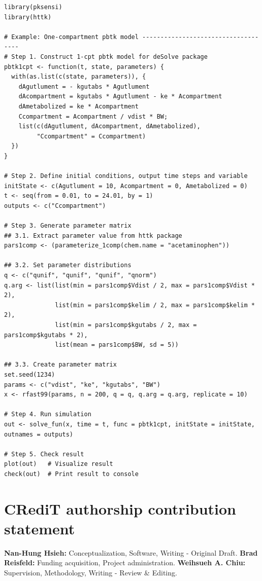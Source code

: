 \documentclass[preprint,12pt, a4paper]{elsarticle}
\begin{document}
\begin{lstlisting}
library(pksensi)
library(httk)

# Example: One-compartment pbtk model ------------------------------------
# Step 1. Construct 1-cpt pbtk model for deSolve package
pbtk1cpt <- function(t, state, parameters) {
  with(as.list(c(state, parameters)), {
    dAgutlument = - kgutabs * Agutlument
    dAcompartment = kgutabs * Agutlument - ke * Acompartment
    dAmetabolized = ke * Acompartment
    Ccompartment = Acompartment / vdist * BW;
    list(c(dAgutlument, dAcompartment, dAmetabolized), 
         "Ccompartment" = Ccompartment) 
  })
}

# Step 2. Define initial conditions, output time steps and variable
initState <- c(Agutlument = 10, Acompartment = 0, Ametabolized = 0)
t <- seq(from = 0.01, to = 24.01, by = 1)
outputs <- c("Ccompartment")

# Step 3. Generate parameter matrix 
## 3.1. Extract parameter value from httk package
pars1comp <- (parameterize_1comp(chem.name = "acetaminophen"))

## 3.2. Set parameter distributions
q <- c("qunif", "qunif", "qunif", "qnorm")
q.arg <- list(list(min = pars1comp$Vdist / 2, max = pars1comp$Vdist * 2),
              list(min = pars1comp$kelim / 2, max = pars1comp$kelim * 2),
              list(min = pars1comp$kgutabs / 2, max = pars1comp$kgutabs * 2),
              list(mean = pars1comp$BW, sd = 5))

## 3.3. Create parameter matrix
set.seed(1234)
params <- c("vdist", "ke", "kgutabs", "BW")
x <- rfast99(params, n = 200, q = q, q.arg = q.arg, replicate = 10)

# Step 4. Run simulation 
out <- solve_fun(x, time = t, func = pbtk1cpt, initState = initState, outnames = outputs)

# Step 5. Check result
plot(out)   # Visualize result
check(out)  # Print result to console
\end{lstlisting}

\section*{CRediT authorship contribution statement}

\textbf{Nan-Hung Hsieh:} Conceptualization, Software, Writing - Original Draft.
\textbf{Brad Reisfeld:} Funding acquisition, Project administration. 
\textbf{Weihsueh A. Chiu:} Supervision, Methodology, Writing - Review \& Editing. 

\end{document}
